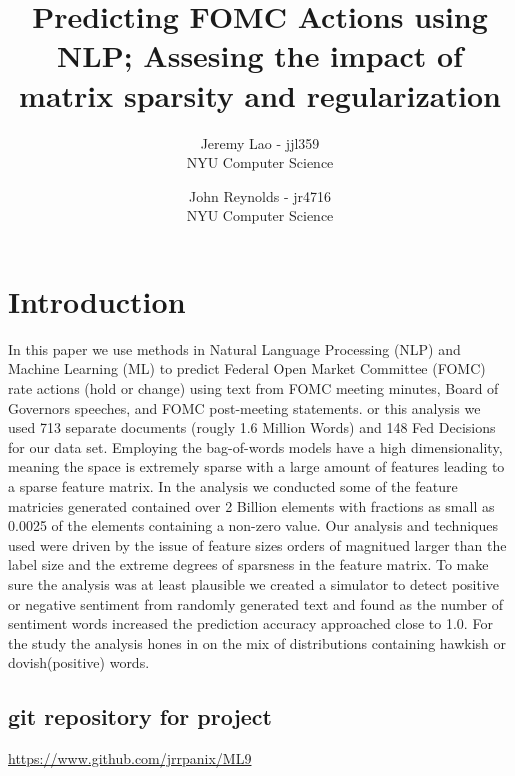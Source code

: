 \documentclass[11pt]{article}
\title{Predicting FOMC Actions using NLP; Assesing the impact of matrix sparsity and regularization}
\author{
        Jeremy Lao - jjl359 \\
        NYU Computer Science \\
            \and
        John Reynolds - jr4716 \\
        NYU Computer Science \\
}
\newcommand{\vertSpace}[1]{\vspace{3mm}}
\begin{document}
{\setlength{\mathindent}{0cm}
\maketitle


\section{Introduction}
In this paper we use methods in Natural Language Processing (NLP) and Machine Learning (ML) to predict Federal Open Market Committee (FOMC) rate actions (hold or change) using text from FOMC meeting minutes, Board of Governors speeches, and FOMC post-meeting statements.  \vertSpace

 
For this analysis we used 713 separate documents (rougly 1.6 Million Words) and 148 Fed Decisions for our data set.  Employing the bag-of-words models have a high dimensionality, meaning the space is extremely sparse with a large amount of features leading to a sparse feature matrix.  
In the analysis we conducted some of the feature matricies generated contained over 2 Billion elements with fractions as small as 0.0025 of the elements containing a non-zero value.  
Our analysis and techniques used were driven by the issue of feature sizes orders of magnitued larger than the label size and the extreme degrees of sparsness in the feature matrix.  
To make sure the analysis was at least plausible we created a simulator to detect positive or negative sentiment from randomly generated text and found as the number of sentiment words increased the prediction accuracy approached close to 1.0.  
For the study the analysis hones in on the mix of distributions containing hawkish or dovish(positive) words.

\subsection{git repository for project}
\url{https://www.github.com/jrrpanix/ML9}

}
\end{document}
